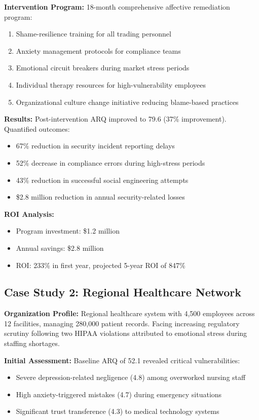 \documentclass[11pt,a4paper]{article}
\begin{document}
\textbf{Intervention Program:}
18-month comprehensive affective remediation program:
\begin{enumerate}
\item Shame-resilience training for all trading personnel
\item Anxiety management protocols for compliance teams
\item Emotional circuit breakers during market stress periods
\item Individual therapy resources for high-vulnerability employees
\item Organizational culture change initiative reducing blame-based practices
\end{enumerate}

\textbf{Results:}
Post-intervention ARQ improved to 79.6 (37\% improvement). Quantified outcomes:
\begin{itemize}
\item 67\% reduction in security incident reporting delays
\item 52\% decrease in compliance errors during high-stress periods
\item 43\% reduction in successful social engineering attempts
\item \$2.8 million reduction in annual security-related losses
\end{itemize}

\textbf{ROI Analysis:}
\begin{itemize}
\item Program investment: \$1.2 million
\item Annual savings: \$2.8 million
\item ROI: 233\% in first year, projected 5-year ROI of 847\%
\end{itemize}

\subsection{Case Study 2: Regional Healthcare Network}

\textbf{Organization Profile:}
Regional healthcare system with 4,500 employees across 12 facilities, managing 280,000 patient records. Facing increasing regulatory scrutiny following two HIPAA violations attributed to emotional stress during staffing shortages.

\textbf{Initial Assessment:}
Baseline ARQ of 52.1 revealed critical vulnerabilities:
\begin{itemize}
\item Severe depression-related negligence (4.8) among overworked nursing staff
\item High anxiety-triggered mistakes (4.7) during emergency situations
\item Significant trust transference (4.3) to medical technology systems
\end{itemize}
\end{document}
